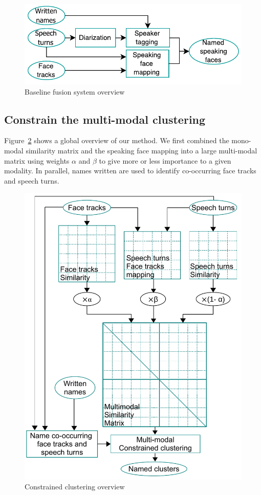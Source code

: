 \documentclass{acm_proc_article-me}
\begin{document}
\begin{figure}[htb]
 \centering
 \includegraphics[width=0.9\linewidth]{figs/baseline.pdf}
 \caption {Baseline fusion system overview}
 \label{fig:gene}
\end{figure}


\subsection{Constrain the multi-modal clustering}

Figure~\ref{fig:gene} shows a global overview of our method. We first combined the mono-modal similarity matrix and the speaking face mapping into a large multi-modal matrix using weights $\alpha$ and $\beta$ to give more or less importance to a given modality. In parallel, names written are used to identify co-occurring face tracks and speech turns.

\begin{figure}[htb]
 \centering
 \includegraphics[width=0.9\linewidth]{figs/schema_clus_contraint.pdf}
 \caption {Constrained clustering overview}
 \label{fig:gene}
\end{figure}
\end{document}
